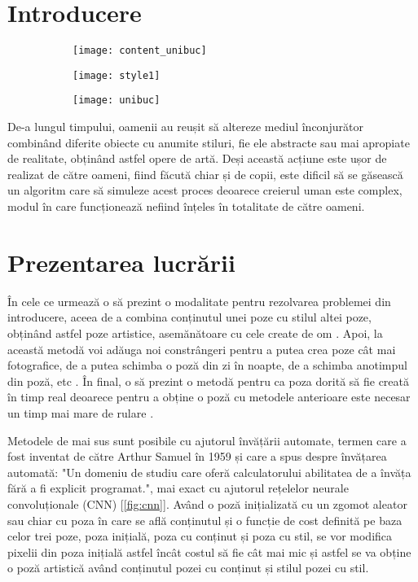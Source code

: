 \section{Introducere}
\begin{figure}[h]
	\centering
	\begin{subfigure}[b]{0.3\textwidth}
		\centering
        \texttt{[image: content\_unibuc]}
        \label{fig:content_unibuc}
	\end{subfigure}
    \hfill
    \begin{subfigure}[b]{0.3\textwidth}
		\centering
        \texttt{[image: style1]}
        \label{fig:style_unibuc}
	\end{subfigure}
    \hfill
    \begin{subfigure}[b]{0.3\textwidth}
		\centering
        \texttt{[image: unibuc]}
        \label{fig:content_style_unibuc}
	\end{subfigure}
    \label{fig:unibuc}
\end{figure}

	De-a lungul timpului, oamenii au reușit să altereze mediul înconjurător combinând diferite obiecte cu anumite stiluri, fie ele abstracte sau mai apropiate de realitate, obținând astfel opere de artă. Deși această acțiune este ușor de realizat de către oameni, fiind făcută chiar și de copii, este dificil să se găsească un algoritm care să simuleze acest proces deoarece creierul uman este complex, modul în care funcționează nefiind înțeles în totalitate de către oameni.

\section{Prezentarea lucrării}
În cele ce urmează o să prezint o modalitate pentru rezolvarea problemei din introducere, aceea de a combina conținutul unei poze cu stilul altei poze, obținând astfel poze artistice, asemănătoare cu cele create de om \cite{gatys2015}. Apoi, la această metodă voi adăuga noi constrângeri pentru a putea crea poze cât mai fotografice, de a putea schimba o poză din zi în noapte, de a schimba anotimpul din poză, etc \cite{luan2017}. În final, o să prezint o metodă pentru ca poza dorită să fie creată în timp real deoarece pentru a obține o poză cu metodele anterioare este necesar un timp mai mare de rulare \cite{johnson2016}.

Metodele de mai sus sunt posibile cu ajutorul învățării automate, termen care a fost inventat de către Arthur Samuel în 1959 și care a spus despre învățarea automată: "Un domeniu de studiu care oferă calculatorului abilitatea de a învăța fără a fi explicit programat.", mai exact cu ajutorul rețelelor neurale convoluționale (CNN) [\ref{fig:cnn}]. Având o poză inițializată cu un zgomot aleator sau chiar cu poza în care se află conținutul și o funcție de cost definită pe baza celor trei poze, poza inițială, poza cu conținut și poza cu stil, se vor modifica pixelii din poza inițială astfel încât costul să fie cât mai mic și astfel se va obține o poză artistică având conținutul pozei cu conținut și stilul pozei cu stil.

